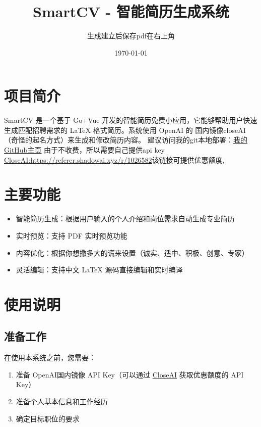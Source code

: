 \documentclass{article}
\begin{document}
\title{SmartCV - 智能简历生成系统}
\author{生成建立后保存pdf在右上角}
\date{\today}

\maketitle

\section{项目简介}
SmartCV 是一个基于 Go+Vue 开发的智能简历免费小应用，它能够帮助用户快速生成匹配招聘需求的 LaTeX 格式简历。系统使用 OpenAI 的 国内镜像closeAI（奇怪的起名方式）来生成和修改简历内容。\newline
建议访问我的git本地部署：\href{https://github.com/ccIisIaIcat}{我的GitHub主页}\newline
由于不收费，所以需要自己提供api key \href{https://referer.shadowai.xyz/r/1026582}{CloseAI:https://referer.shadowai.xyz/r/1026582}该链接可提供优惠额度, \newline

\section{主要功能}
\begin{itemize}
    \item 智能简历生成：根据用户输入的个人介绍和岗位需求自动生成专业简历
    \item 实时预览：支持 PDF 实时预览功能
    \item 内容优化：根据你想撒多大的谎来设置（诚实、适中、积极、创意、专家）
    \item 灵活编辑：支持中文 LaTeX 源码直接编辑和实时编译
\end{itemize}

\section{使用说明}
\subsection{准备工作}
在使用本系统之前，您需要：
\begin{enumerate}
    \item 准备 OpenAI国内镜像 API Key（可以通过 \href{https://referer.shadowai.xyz/r/1026582}{CloseAI} 获取优惠额度的 API Key）
    \item 准备个人基本信息和工作经历
    \item 确定目标职位的要求
\end{enumerate}
\end{document}
